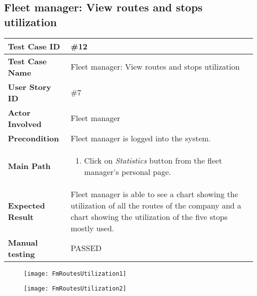 \subsection{Fleet manager: View routes and stops utilization}
\begin{center}
	\begin{tabular} { | m{3.5cm} | m{9.5cm} | }
		\hline
		\textbf{Test Case ID} & \#12\\
		\hline
		\textbf{Test Case Name} & Fleet manager: View routes and stops utilization\\
		\hline
		\textbf{User Story ID} & \#7 \\
		\hline
		\textbf{Actor Involved} & Fleet manager\\
		\hline
		\textbf{Precondition} & Fleet manager is logged into the system.\\
		\hline
		\textbf{Main Path} & 
		\begin{enumerate}
			\item Click on \textit{Statistics} button from the fleet manager's personal page.
		\end{enumerate}\\
		\hline
		\textbf{Expected Result} & Fleet manager is able to see a chart showing the utilization of all the routes of the company and a chart showing the utilization of the five stops mostly used.\\
		\hline
	\textbf{Manual testing} & PASSED\\
	\hline
\end{tabular}
\end{center}
\begin{figure}[H]
\centering
\texttt{[image: FmRoutesUtilization1]}
\end{figure}
\begin{figure}[H]
\centering
\texttt{[image: FmRoutesUtilization2]}
\end{figure}
\newpage
